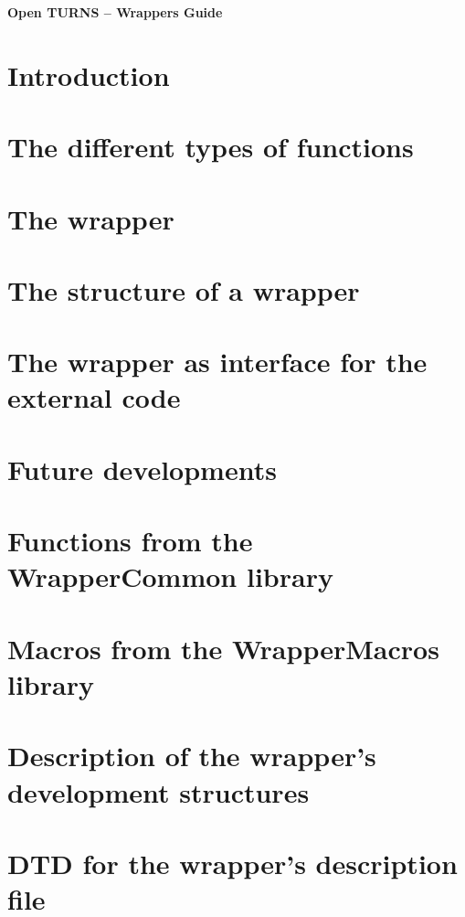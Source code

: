 \documentclass[a4paper,11pt]{article}
\begin{document}
\begin{titlepage}
  \vspace*{2cm}
  \begin{center}
    {\huge \bf Open TURNS -- Wrappers Guide}
    
  \end{center}
\end{titlepage}

\newpage


\cleardoublepage
\tableofcontents
\cleardoublepage


\cleardoublepage

\section{Introduction}

\cleardoublepage

\section{The different types of functions}

\cleardoublepage

\section{The wrapper}

\cleardoublepage

\section{The structure of a wrapper}

\cleardoublepage

\section{The wrapper as interface for the external code}

\cleardoublepage

\section{Future developments}

\cleardoublepage

\appendix
\section{Functions from the WrapperCommon library}

\cleardoublepage

\section{Macros from the WrapperMacros library}

\cleardoublepage

\section{Description of the wrapper's development structures}

\cleardoublepage

\section{DTD for the wrapper's description file}

\cleardoublepage

\printindex
\end{document}
